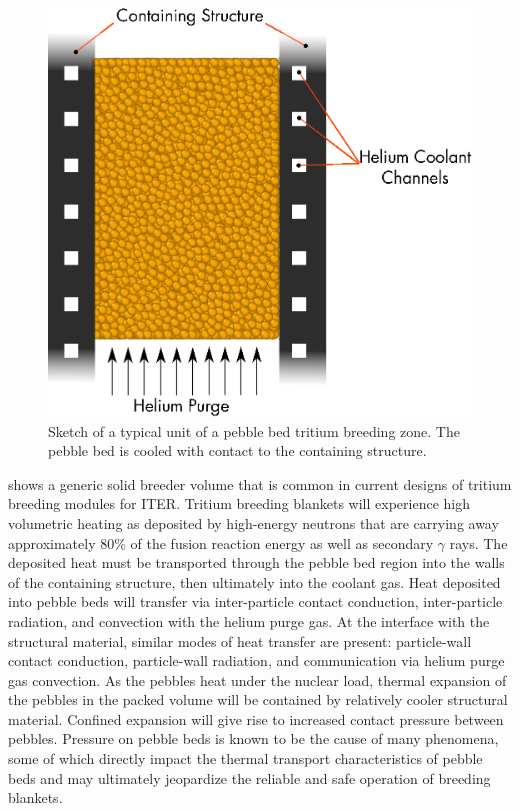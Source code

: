 \begin{figure}[ht]
	\centering
	\includegraphics[width=\singleimagewidth]{figures/solid_breeder_sketch} 
	\caption{Sketch of a typical unit of a pebble bed tritium breeding zone. The pebble bed is cooled with contact to the containing structure.}
	\label{fig:solid-breeder-sketch}
\end{figure}


 shows a generic solid breeder volume that is common in current designs of tritium breeding modules for ITER. Tritium breeding blankets will experience high volumetric heating as deposited by high-energy neutrons that are carrying away approximately 80\% of the fusion reaction energy as well as secondary $\gamma$ rays. The deposited heat must be transported through the pebble bed region into the walls of the containing structure, then ultimately into the coolant gas. Heat deposited into pebble beds will transfer via inter-particle contact conduction, inter-particle radiation, and convection with the helium purge gas. At the interface with the structural material, similar modes of heat transfer are present: particle-wall contact conduction, particle-wall radiation, and communication via helium purge gas convection. As the pebbles heat under the nuclear load, thermal expansion of the pebbles in the packed volume will be contained by relatively cooler structural material. Confined expansion will give rise to increased contact pressure between pebbles. Pressure on pebble beds is known to be the cause of many phenomena, some of which directly impact the thermal transport characteristics of pebble beds and may ultimately jeopardize the reliable and safe operation of breeding blankets. 


